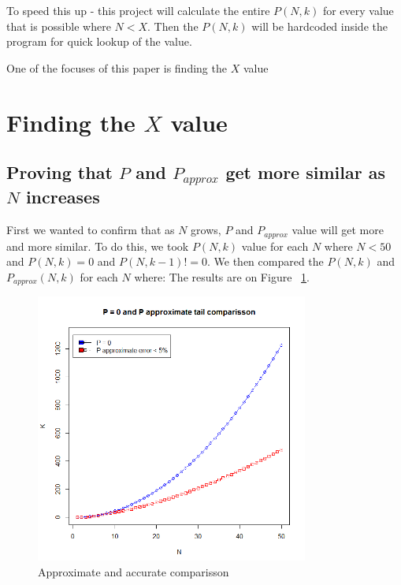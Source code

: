 \documentclass[12pt]{article}
\begin{document}
To speed this up - this project will calculate the entire $P(N, k)$ for every value that is possible where $N < X$. Then the $P(N, k)$ will be hardcoded inside the program for quick lookup of the value.

One of the focuses of this paper is finding the $X$ value

\newpage

\section{Finding the $X$ value}
\subsection{Proving that $P$ and $P_{approx}$ get more similar as $N$ increases}
First we wanted to confirm that as $N$ grows, $P$ and $P_{approx}$ value will get more and more similar. To do this, we took $P(N, k)$ value for each $N$ where
$N < 50$ and $P(N, k)  = 0$ and $P(N, k - 1) != 0$.
We then compared the $P(N, k)$ and $P_{approx} (N, k)$ for each $N$ where:
The results are on Figure ~\ref{fig:T0vsN}.


\begin{figure}[!h]
	\centering
  \includegraphics[width=0.8\textwidth]{T0vsN}
	\caption{Approximate and accurate comparisson}
	\label{fig:T0vsN}
\end{figure}
\end{document}
